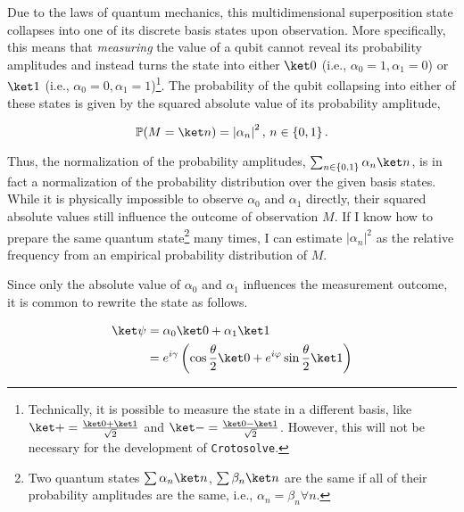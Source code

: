 Due to the laws of quantum mechanics, this multidimensional superposition state
collapses into one of its discrete basis states upon observation.
More specifically, this means that \emph{measuring} the value of a qubit cannot
reveal its probability amplitudes and instead turns the state into either
$\ket 0$ (i.e., $\alpha_0 = 1, \alpha_1 = 0$) or
$\ket 1$ (i.e., $\alpha_0 = 0, \alpha_1 = 1$)\footnote{
    Technically, it is possible to measure the state in a different basis, like
    $\ket + = \frac{\ket 0 + \ket 1}{\sqrt 2}$ and
    $\ket - = \frac{\ket 0 - \ket 1}{\sqrt 2}$.
    However, this will not be necessary for the development of
    \texttt{Crotosolve}.
}.
The probability of the qubit collapsing into either of these states is given by
the squared absolute value of its probability amplitude,

$$\mathbb P(M = \ket n) = \left| \alpha_n \right|^2,\, n \in \left\{0, 1\right\}.$$

Thus, the normalization of the probability amplitudes, 
$\sum_{n \in \left\{0, 1\right\}} \alpha_n \ket n$, is in fact a normalization
of the probability distribution over the given basis states.
While it is physically impossible to observe $\alpha_0$ and $\alpha_1$ directly,
their squared absolute values still influence the outcome of observation $M$.
If I know how to prepare the same quantum state\footnote{
    Two quantum states $\sum \alpha_n \ket n$, $\sum \beta_n \ket n$ are the
    same if all of their probability amplitudes are the same,
    i.e., $\alpha_n = \beta_n \forall n$.
} many times, I can estimate $\left|\alpha_n\right|^2$ as the relative frequency
from an empirical probability distribution of $M$.

Since only the absolute value of $\alpha_0$ and $\alpha_1$ influences the
measurement outcome, it is common to rewrite the state as follows.

\begin{equation}
    \begin{split}
        \ket \psi
            &= \alpha_0 \ket 0 + \alpha_1 \ket 1\\
            &= e^{i\gamma} \left(\cos \frac\theta2 \ket 0 + e^{i\varphi} \sin \frac\theta2 \ket 1\right)
    \end{split}
\end{equation}

